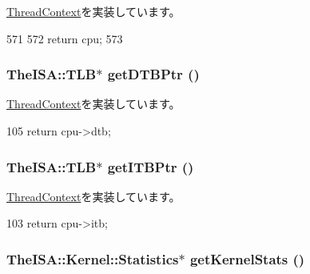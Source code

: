\hyperlink{classThreadContext_ad10a7ef049c2d2ffadfc809341e66d4e}{ThreadContext}を実装しています。


\begin{DoxyCode}
571 {
572     return cpu;
573 }
\end{DoxyCode}
\hypertarget{classOzoneCPU_1_1OzoneTC_a2fe6a07c44bc2a4d83b86bea605ba971}{
\subsubsection[{getDTBPtr}]{\setlength{\rightskip}{0pt plus 5cm}TheISA::TLB$\ast$ getDTBPtr ()}}
\label{classOzoneCPU_1_1OzoneTC_a2fe6a07c44bc2a4d83b86bea605ba971}


\hyperlink{classThreadContext_a235a0443e22590632cfc95cd4f6db1ae}{ThreadContext}を実装しています。


\begin{DoxyCode}
105 { return cpu->dtb; }
\end{DoxyCode}
\hypertarget{classOzoneCPU_1_1OzoneTC_a95b7e95d0558cd03d69613142fff9137}{
\subsubsection[{getITBPtr}]{\setlength{\rightskip}{0pt plus 5cm}TheISA::TLB$\ast$ getITBPtr ()}}
\label{classOzoneCPU_1_1OzoneTC_a95b7e95d0558cd03d69613142fff9137}


\hyperlink{classThreadContext_aaae22e0dcf2f312619915bbf34509ba4}{ThreadContext}を実装しています。


\begin{DoxyCode}
103 { return cpu->itb; }
\end{DoxyCode}
\hypertarget{classOzoneCPU_1_1OzoneTC_a3faa5e314c06241296ab582bb891a06a}{
\subsubsection[{getKernelStats}]{\setlength{\rightskip}{0pt plus 5cm}TheISA::Kernel::Statistics$\ast$ getKernelStats ()}}
\label{classOzoneCPU_1_1OzoneTC_a3faa5e314c06241296ab582bb891a06a}


